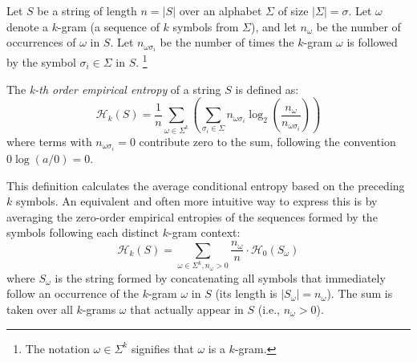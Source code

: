 \noindent Let $S$ be a string of length $n = |S|$ over an alphabet $\Sigma$ of size $|\Sigma| = \sigma$. Let $\omega$ denote a $k$-gram (a sequence of $k$ symbols from $\Sigma$), and let $n_\omega$ be the number of occurrences of $\omega$ in $S$. Let $n_{\omega \sigma_i}$ be the number of times the $k$-gram $\omega$ is followed by the symbol $\sigma_i \in \Sigma$ in $S$. \footnote{The notation $\omega \in \Sigma^k$ signifies that $\omega$ is a $k$-gram.}

\begin{definition} \label{def:kth_order_empirical_entropy}
    The \emph{k-th order empirical entropy} of a string $S$ is defined as:
    \begin{equation}\label{eq:kth_order_entropy_formula1}
        \mathcal{H}_k(S) = \frac{1}{n} \sum_{\omega \in \Sigma^k} \left ( \sum_{\sigma_i \in \Sigma} n_{\omega\sigma_i} \log_2 \left ( \frac{n_\omega}{n_{\omega\sigma_i}} \right) \right )
    \end{equation}
    where terms with $n_{\omega\sigma_i} = 0$ contribute zero to the sum, following the convention $0 \log (a/0) = 0$.
\end{definition}

\noindent This definition calculates the average conditional entropy based on the preceding $k$ symbols. An equivalent and often more intuitive way to express this is by averaging the zero-order empirical entropies of the sequences formed by the symbols following each distinct $k$-gram context:
\begin{equation}\label{eq:kth_order_entropy_formula2}
    \mathcal{H}_k(S) = \sum_{\omega \in \Sigma^k, n_\omega > 0} \frac{n_\omega}{n} \cdot \mathcal{H}_0(S_\omega)
\end{equation}
where $S_\omega$ is the string formed by concatenating all symbols that immediately follow an occurrence of the $k$-gram $\omega$ in $S$ (its length is $|S_\omega| = n_\omega$). The sum is taken over all $k$-grams $\omega$ that actually appear in $S$ (i.e., $n_\omega > 0$).

